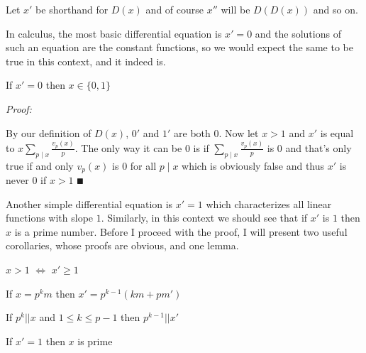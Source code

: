 \documentclass[paper=a4,fontsize=paper,12.5pt]{book}
\newcommand{\3}{\vspace*{3mm}}
\newcommand{\Proof}{\textit{Proof:}}
\newcommand{\IFF}{$\Longleftrightarrow$ \hspace*{.5mm}}
\newcommand{\D}{\vert \vert}
\begin{document}
\3

Let $x'$ be shorthand for $D(x)$ and of course $x''$ will be $D(D(x))$ and so on.

\3

In calculus, the most basic differential equation is $x' = 0$ and the solutions of such an equation are the constant functions, so we would expect the same to be true in this context, and it indeed is.

\begin{theorem}

If $x' = 0$ then $x \in \{0,1\}$


\end{theorem}

\Proof 

By our definition of $D(x)$, $0'$ and $1'$ are both $0$. Now let $x>1$ and $x'$ is equal to $x\sum_{p \mid x} \frac{v_p(x)}{p}$. The only way it can be $0$ is if $\sum_{p \mid x} \frac{v_p(x)}{p}$ is $0$ and that's only true if and only $v_p(x)$ is $0$ for all $p \mid x$ which is obviously false and thus $x'$ is never $0$ if $x>1$ $\QED$

\3

Another simple differential equation is $x' = 1$ which characterizes all linear functions with slope $1$. Similarly, in this context we should see that if $x'$ is $1$ then $x$ is a prime number. Before I proceed with the proof, I will present two useful corollaries, whose proofs are obvious, and one lemma. 

\3

\begin{corollary}
 
  $x>1$ \IFF $x' \geq 1$


\end{corollary}

\3


\begin{corollary}

If $x = p^km$ then $x' = p^{k-1}(km + pm')$ 


\end{corollary}

\3

\begin{lemma}

If $p^k \D x $ and $1\leq k \leq p-1$ then $p^{k-1} \D x'$

\end{lemma}

\3

\begin{theorem}

If $x' = 1$ then $x$ is prime 


\end{theorem}
\end{document}
